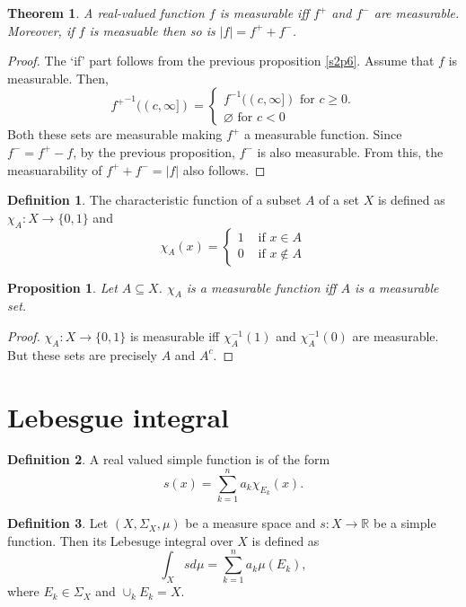 \documentclass{article}
\newcommand{\sor}{\mathbb{R}}
\theoremstyle{plain}
\newtheorem{thm}{Theorem}
\numberwithin{thm}{section}
\theoremstyle{plain}
\newtheorem{prop}{Proposition}
\numberwithin{prop}{section}
\theoremstyle{definition}
\newtheorem{defn}{Definition}
\numberwithin{defn}{section}
\theoremstyle{remark}
\theoremstyle{plain}
\numberwithin{cor}{section}
\numberwithin{equation}{section}
\begin{document}
\begin{thm}\label{s1t1}
A real-valued function $f$ is measurable iff $f^+$ and $f^-$ are measurable. 
Moreover, if $f$ is measuable then so is $|f| = f^+ + f^-$.
\end{thm}
\begin{proof}
The `if' part follows from the previous proposition \ref{s2p6}. Assume that
$f$ is measurable. Then,
\[
{f^+}^{-1}((c, \infty]) = \begin{cases}
f^{-1}((c, \infty]) \text{ for } c \ge 0. \\
\varnothing \text{ for } c < 0
\end{cases}
\]
Both these sets are measurable making $f^+$ a measurable function. Since $f^- =
f^+ - f$, by the previous proposition, $f^-$ is also measurable. From this, the
measuarability of $f^+ + f^- = |f|$ also follows.
\end{proof}

\begin{defn}\label{s2d3}
The characteristic function of a subset $A$ of a set $X$ is defined as
$\chi_A: X \rightarrow \{0, 1\}$ and
\[
\chi_A(x) = \begin{cases} 1 & \text{ if } x \in A \\
0 & \text{ if } x \notin A
\end{cases}
\]
\end{defn}

\begin{prop}\label{s2p7}
Let $A \subseteq X$. $\chi_A$ is a measurable function iff $A$ is a measurable
set.
\end{prop}
\begin{proof}
$\chi_A: X \rightarrow \{0, 1\}$ is measurable iff $\chi_A^{-1}(1)$ and 
$\chi_A^{-1}(0)$ are measurable. But these sets are precisely $A$ and $A^c$.
\end{proof}

\section{Lebesgue integral}\label{s3}
\begin{defn}\label{s3d1}
A real valued simple function is of the form
\[
s(x) = \sum_{k=1}^n a_k \chi_{E_k}(x).
\]
\end{defn}

\begin{defn}\label{s3d2}
Let $(X, \Sigma_X, \mu)$ be a measure space and $s: X \rightarrow \sor$ be
a simple function. Then its Lebesuge integral over $X$ is defined as
\[
\int_Xs d\mu = \sum_{k=1}^na_k\mu(E_k),
\]
where $E_k \in \Sigma_X$ and $\cup_k E_k = X$.
\end{defn}
\end{document}
